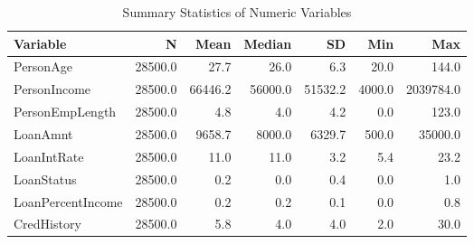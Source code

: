 \begin{table}[H]\centering
\caption{Summary Statistics of Numeric Variables}
\label{Table 2:summary_stats}
\begin{tabular}{lrrrrrr}
\toprule
Variable & N & Mean & Median & SD & Min & Max \\
\midrule
PersonAge & 28500.0 & 27.7 & 26.0 & 6.3 & 20.0 & 144.0 \\
PersonIncome & 28500.0 & 66446.2 & 56000.0 & 51532.2 & 4000.0 & 2039784.0 \\
PersonEmpLength & 28500.0 & 4.8 & 4.0 & 4.2 & 0.0 & 123.0 \\
LoanAmnt & 28500.0 & 9658.7 & 8000.0 & 6329.7 & 500.0 & 35000.0 \\
LoanIntRate & 28500.0 & 11.0 & 11.0 & 3.2 & 5.4 & 23.2 \\
LoanStatus & 28500.0 & 0.2 & 0.0 & 0.4 & 0.0 & 1.0 \\
LoanPercentIncome & 28500.0 & 0.2 & 0.2 & 0.1 & 0.0 & 0.8 \\
CredHistory & 28500.0 & 5.8 & 4.0 & 4.0 & 2.0 & 30.0 \\
\bottomrule
\end{tabular}
\end{table}
